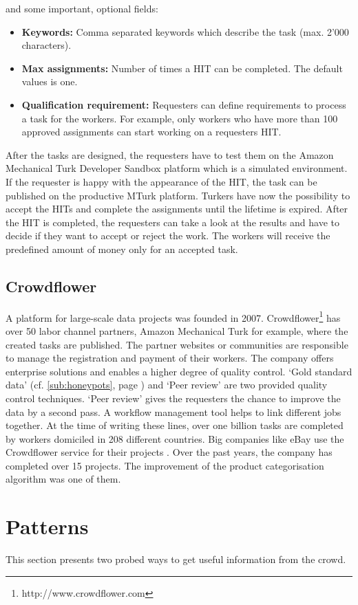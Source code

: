 and some important, optional fields: 
\begin{itemize}
	\item \textbf{Keywords:} Comma separated keywords which describe the task (max. 2'000 characters). 
	\item \textbf{Max assignments:} Number of times a HIT can be completed. The default values is one. 
	\item \textbf{Qualification requirement:} Requesters can define requirements to process a task for the workers. For example, only workers who have more than 100 approved assignments can start working on a requesters HIT. 
\end{itemize}
After the tasks are designed, the requesters have to test them on the Amazon Mechanical Turk Developer Sandbox platform which is a simulated environment. If the requester is happy with the appearance of the HIT, the task can be published on the productive MTurk platform. Turkers have now the possibility to accept the HITs and complete the assignments until the lifetime is expired. After the HIT is completed, the requesters can take a look at the results and have to decide if they want to accept or reject the work. The workers will receive the predefined amount of money only for an accepted task. 

\subsection{Crowdflower}
A platform for large-scale data projects was founded in 2007. Crowdflower\footnote{http://www.crowdflower.com} has over 50 labor channel partners, Amazon Mechanical Turk for example, where the created tasks are published. The partner websites or communities are responsible to manage the registration and payment of their workers. The company offers enterprise solutions and enables a higher degree of quality control. `Gold standard data' (cf. \ref{sub:honeypots}, page \pageref{sub:honeypots}) and `Peer review' are two provided quality control techniques. `Peer review' gives the requesters the chance to improve the data by a second pass. A workflow management tool helps to link different jobs together. At the time of writing these lines, over one billion tasks are completed by workers domiciled in 208 different countries. Big companies like eBay use the Crowdflower service for their projects \cite{crowdflower_casestudy}. Over the past years, the company has completed over 15 projects. The improvement of the product categorisation algorithm was one of them.
\section{Patterns}
This section presents two probed ways to get useful information from the crowd.
